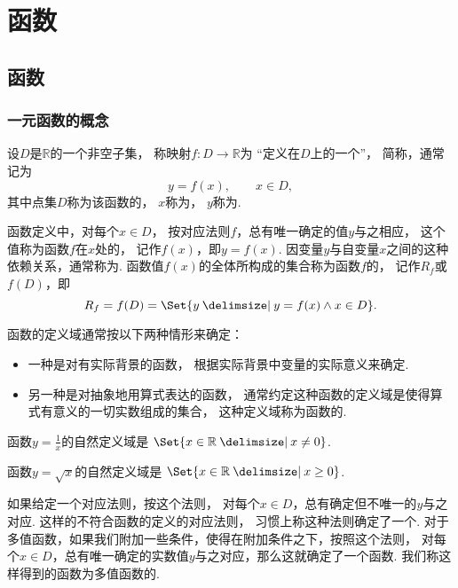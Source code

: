 \chapter{函数}
\section{函数}
\subsection{一元函数的概念}
设\(D\)是\(\mathbb{R}\)的一个非空子集，
称映射\(f\colon D \to \mathbb{R}\)为
“定义在\(D\)上的一个”，
简称，通常记为\[
	y = f(x), \qquad x \in D,
\]
其中点集\(D\)称为该函数的，
\(x\)称为，
\(y\)称为.

函数定义中，对每个\(x \in D\)，
按对应法则\(f\)，总有唯一确定的值\(y\)与之相应，
这个值称为函数\(f\)在\(x\)处的，
记作\(f(x)\)，即\(y=f(x)\).
因变量\(y\)与自变量\(x\)之间的这种依赖关系，通常称为.
函数值\(f(x)\)的全体所构成的集合称为函数\(f\)的，
记作\(R_f\)或\(f(D)\)，即\[
	R_f = f(D) = \Set{ y \given y = f(x) \land x \in D }.
\]

函数的定义域通常按以下两种情形来确定：
\begin{itemize}
	\item 一种是对有实际背景的函数，
	根据实际背景中变量的实际意义来确定.
	\item 另一种是对抽象地用算式表达的函数，
	通常约定这种函数的定义域是使得算式有意义的一切实数组成的集合，
	这种定义域称为函数的.
\end{itemize}

\begin{example}
函数\(y = \frac{1}{x}\)的自然定义域是
\(\Set{ x \in \mathbb{R} \given x \neq 0 }\).
\end{example}

\begin{example}
函数\(y = \sqrt{x}\)的自然定义域是
\(\Set{ x \in \mathbb{R} \given x \geq 0 }\).
\end{example}

如果给定一个对应法则，按这个法则，
对每个\(x \in D\)，总有确定但不唯一的\(y\)与之对应.
这样的不符合函数的定义的对应法则，
习惯上称这种法则确定了一个.
对于多值函数，如果我们附加一些条件，使得在附加条件之下，按照这个法则，
对每个\(x \in D\)，总有唯一确定的实数值\(y\)与之对应，那么这就确定了一个函数.
我们称这样得到的函数为多值函数的.

